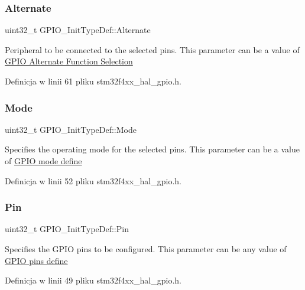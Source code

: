 \subsubsection{\texorpdfstring{Alternate}{Alternate}}
{\footnotesize\ttfamily uint32\+\_\+t G\+P\+I\+O\+\_\+\+Init\+Type\+Def\+::\+Alternate}

Peripheral to be connected to the selected pins. This parameter can be a value of \hyperlink{group___g_p_i_o___alternate__function__selection}{G\+P\+IO Alternate Function Selection} 

Definicja w linii 61 pliku stm32f4xx\+\_\+hal\+\_\+gpio.\+h.

\mbox{\label{struct_g_p_i_o___init_type_def_a3731d84343e65a98fdf51056a8d30321}} 
\subsubsection{\texorpdfstring{Mode}{Mode}}
{\footnotesize\ttfamily uint32\+\_\+t G\+P\+I\+O\+\_\+\+Init\+Type\+Def\+::\+Mode}

Specifies the operating mode for the selected pins. This parameter can be a value of \hyperlink{group___g_p_i_o__mode__define}{G\+P\+IO mode define} 

Definicja w linii 52 pliku stm32f4xx\+\_\+hal\+\_\+gpio.\+h.

\mbox{\label{struct_g_p_i_o___init_type_def_aa807fb62b2b2cf937092abba81370b87}} 
\subsubsection{\texorpdfstring{Pin}{Pin}}
{\footnotesize\ttfamily uint32\+\_\+t G\+P\+I\+O\+\_\+\+Init\+Type\+Def\+::\+Pin}

Specifies the G\+P\+IO pins to be configured. This parameter can be any value of \hyperlink{group___g_p_i_o__pins__define}{G\+P\+IO pins define} 

Definicja w linii 49 pliku stm32f4xx\+\_\+hal\+\_\+gpio.\+h.

\mbox{\label{struct_g_p_i_o___init_type_def_aa2d3a6b0c4e10ac20882b4a37799ced1}} 
